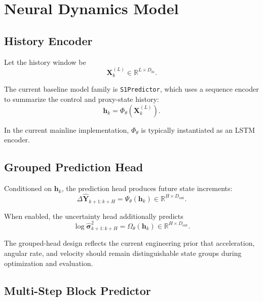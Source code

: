 \section{Neural Dynamics Model}

\subsection{History Encoder}

Let the history window be
\begin{equation}
\mathbf{X}^{(L)}_k \in \mathbb{R}^{L \times D_{\mathrm{in}}}.
\end{equation}

The current baseline model family is \texttt{S1Predictor}, which uses a sequence encoder to summarize the control and proxy-state history:
\begin{equation}
\mathbf{h}_k = \Phi_{\theta}\!\left(\mathbf{X}^{(L)}_k\right).
\end{equation}

In the current mainline implementation, $\Phi_{\theta}$ is typically instantiated as an LSTM encoder.

\subsection{Grouped Prediction Head}

Conditioned on $\mathbf{h}_k$, the prediction head produces future state increments:
\begin{equation}
\Delta \hat{\mathbf{Y}}_{k+1:k+H}
=
\Psi_{\theta}\!\left(\mathbf{h}_k\right)
\in \mathbb{R}^{H \times D_{\mathrm{out}}}.
\end{equation}

When enabled, the uncertainty head additionally predicts
\begin{equation}
\log \hat{\boldsymbol{\sigma}}^2_{k+1:k+H}
=
\Omega_{\theta}\!\left(\mathbf{h}_k\right)
\in \mathbb{R}^{H \times D_{\mathrm{out}}}.
\end{equation}

The grouped-head design reflects the current engineering prior that acceleration, angular rate, and velocity should remain distinguishable state groups during optimization and evaluation.

\subsection{Multi-Step Block Predictor}

